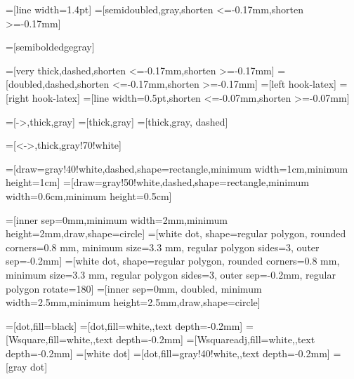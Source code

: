=[line width=1.4pt] %
=[semidoubled,gray,shorten <=-0.17mm,shorten >=-0.17mm]

=[semiboldedgegray]

=[very thick,dashed,shorten <=-0.17mm,shorten >=-0.17mm]
=[doubled,dashed,shorten <=-0.17mm,shorten >=-0.17mm]
=[left hook-latex]
=[right hook-latex]
=[line width=0.5pt,shorten <=-0.07mm,shorten >=-0.07mm]

=[->,thick,gray]
=[thick,gray]
=[thick,gray, dashed]

=[<->,thick,gray!70!white]

=[draw=gray!40!white,dashed,shape=rectangle,minimum width=1cm,minimum height=1cm]
=[draw=gray!50!white,dashed,shape=rectangle,minimum width=0.6cm,minimum height=0.5cm]

\newcommand{\measurement}{%
  \tikz[scale=0.6]{%
    \draw [use as bounding box,draw=none] (0,-0.1) rectangle (1,0.7);%
    \draw [fill=white] (1,0) arc (0:180:5mm);%
    \draw (0,0) -- (1,0) (0.5,0) -- +(60:7mm);%
  }%
}


=[inner sep=0mm,minimum width=2mm,minimum height=2mm,draw,shape=circle]  
=[white dot, shape=regular polygon, rounded corners=0.8 mm, minimum size=3.3 mm, regular polygon sides=3, outer sep=-0.2mm]
=[white dot, shape=regular polygon, rounded corners=0.8 mm, minimum size=3.3 mm, regular polygon sides=3, outer sep=-0.2mm, regular polygon rotate=180]
=[inner sep=0mm, doubled, minimum width=2.5mm,minimum height=2.5mm,draw,shape=circle]

=[dot,fill=black]
=[dot,fill=white,,text depth=-0.2mm]
=[Wsquare,fill=white,,text depth=-0.2mm]
=[Wsquareadj,fill=white,,text depth=-0.2mm]
=[white dot] %
=[dot,fill=gray!40!white,,text depth=-0.2mm]
=[gray dot] %

